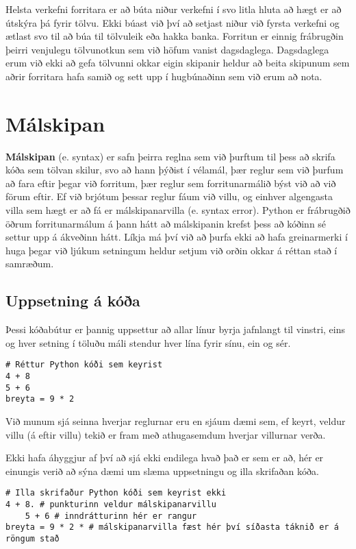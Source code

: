 Helsta verkefni forritara er að búta niður verkefni í svo litla hluta að hægt er að útskýra þá fyrir tölvu.
Ekki búast við því að setjast niður við fyrsta verkefni og ætlast svo til að búa til tölvuleik eða hakka banka.
Forritun er einnig frábrugðin þeirri venjulegu tölvunotkun sem við höfum vanist dagsdaglega.
Dagsdaglega erum við ekki að gefa tölvunni okkar eigin skipanir heldur að beita skipunum sem aðrir forritara hafa samið og sett upp í hugbúnaðinn sem við erum að nota.


\section{Málskipan}

\textbf{Málskipan} (e. syntax) er safn þeirra reglna sem við þurftum til þess að skrifa kóða sem tölvan skilur, svo að hann þýðist í vélamál, þær reglur sem við þurfum að fara eftir þegar við forritum, þær reglur sem forritunarmálið býst við að við förum eftir. 
Ef við brjótum þessar reglur fáum við villu, og einhver algengasta villa sem hægt er að fá er málskipanarvilla (e. syntax error). 
Python er frábrugðið öðrum forritunarmálum á þann hátt að málskipanin krefst þess að kóðinn sé settur upp á ákveðinn hátt. 
Líkja má því við að þurfa ekki að hafa greinarmerki í huga þegar við ljúkum setningum heldur setjum við orðin okkar á réttan stað í samræðum.

\subsection{Uppsetning á kóða}
Þessi kóðabútur er þannig uppsettur að allar línur byrja jafnlangt til vinstri, eins og hver setning í töluðu máli stendur hver lína fyrir sínu, ein og sér.
\begin{lstlisting}[caption=Réttur Python kóði, label=lst:inng-kóðadæmi]
# Réttur Python kóði sem keyrist
4 + 8
5 + 6
breyta = 9 * 2
\end{lstlisting}

Við munum sjá seinna hverjar reglurnar eru en sjáum dæmi sem, ef keyrt, veldur villu (á eftir villu) tekið er fram með athugasemdum hverjar villurnar verða.

Ekki hafa áhyggjur af því að sjá ekki endilega hvað það er sem er að, hér er einungis verið að sýna dæmi um slæma uppsetningu og illa skrifaðan kóða.

\begin{lstlisting}[caption=Rangur Python kóði sem veldur villu, label=lst:inng-malskipanarvilla]
# Illa skrifaður Python kóði sem keyrist ekki
4 + 8. # punkturinn veldur málskipanarvillu
	5 + 6 # inndrátturinn hér er rangur
breyta = 9 * 2 * # málskipanarvilla fæst hér því síðasta táknið er á röngum stað
\end{lstlisting}

